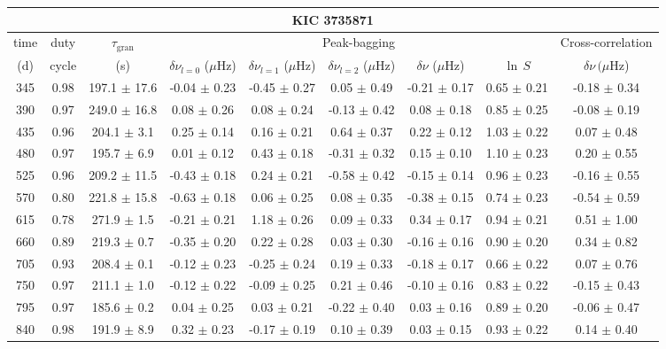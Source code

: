 \documentclass[twocolumn]{aastex61}%
\begin{document}
\begin{table*}[ht]\centering\fontsize{9.}{7.}\selectfont
\begin{tabular}{ccc|ccccc|c}
\multicolumn{9}{c}{KIC 3735871}\\ \hline\hline
time & duty & $\tau_\text{gran}$ &\multicolumn{5}{c|}{Peak-bagging}&Cross-correlation\\
(d)& cycle & (s)&$\delta\nu_{l=0}$ ($\mu$Hz) & $\delta\nu_{l=1}$ ($\mu$Hz) & $\delta\nu_{l=2}$ ($\mu$Hz) & $\delta\nu$ ($\mu$Hz)& $\ln\,S$ & $\delta\nu\,(\mu$Hz)\\\hline
345 & 0.98 & 197.1 $\pm$ 17.6 & -0.04 $\pm$ 0.23 & -0.45 $\pm$ 0.27 & 0.05 $\pm$ 0.49 & -0.21 $\pm$ 0.17 & 0.65 $\pm$ 0.21 & -0.18 $\pm$ 0.34\\
390 & 0.97 & 249.0 $\pm$ 16.8 & 0.08 $\pm$ 0.26 & 0.08 $\pm$ 0.24 & -0.13 $\pm$ 0.42 & 0.08 $\pm$ 0.18 & 0.85 $\pm$ 0.25 & -0.08 $\pm$ 0.19\\
435 & 0.96 & 204.1 $\pm$ 3.1 & 0.25 $\pm$ 0.14 & 0.16 $\pm$ 0.21 & 0.64 $\pm$ 0.37 & 0.22 $\pm$ 0.12 & 1.03 $\pm$ 0.22 & 0.07 $\pm$ 0.48\\
480 & 0.97 & 195.7 $\pm$ 6.9 & 0.01 $\pm$ 0.12 & 0.43 $\pm$ 0.18 & -0.31 $\pm$ 0.32 & 0.15 $\pm$ 0.10 & 1.10 $\pm$ 0.23 & 0.20 $\pm$ 0.55\\
525 & 0.96 & 209.2 $\pm$ 11.5 & -0.43 $\pm$ 0.18 & 0.24 $\pm$ 0.21 & -0.58 $\pm$ 0.42 & -0.15 $\pm$ 0.14 & 0.96 $\pm$ 0.23 & -0.16 $\pm$ 0.55\\
570 & 0.80 & 221.8 $\pm$ 15.8 & -0.63 $\pm$ 0.18 & 0.06 $\pm$ 0.25 & 0.08 $\pm$ 0.35 & -0.38 $\pm$ 0.15 & 0.74 $\pm$ 0.23 & -0.54 $\pm$ 0.59\\
615 & 0.78 & 271.9 $\pm$ 1.5 & -0.21 $\pm$ 0.21 & 1.18 $\pm$ 0.26 & 0.09 $\pm$ 0.33 & 0.34 $\pm$ 0.17 & 0.94 $\pm$ 0.21 & 0.51 $\pm$ 1.00\\
660 & 0.89 & 219.3 $\pm$ 0.7 & -0.35 $\pm$ 0.20 & 0.22 $\pm$ 0.28 & 0.03 $\pm$ 0.30 & -0.16 $\pm$ 0.16 & 0.90 $\pm$ 0.20 & 0.34 $\pm$ 0.82\\
705 & 0.93 & 208.4 $\pm$ 0.1 & -0.12 $\pm$ 0.23 & -0.25 $\pm$ 0.24 & 0.19 $\pm$ 0.33 & -0.18 $\pm$ 0.17 & 0.66 $\pm$ 0.22 & 0.07 $\pm$ 0.76\\
750 & 0.97 & 211.1 $\pm$ 1.0 & -0.12 $\pm$ 0.22 & -0.09 $\pm$ 0.25 & 0.21 $\pm$ 0.46 & -0.10 $\pm$ 0.16 & 0.83 $\pm$ 0.22 & -0.15 $\pm$ 0.43\\
795 & 0.97 & 185.6 $\pm$ 0.2 & 0.04 $\pm$ 0.25 & 0.03 $\pm$ 0.21 & -0.22 $\pm$ 0.40 & 0.03 $\pm$ 0.16 & 0.89 $\pm$ 0.20 & -0.06 $\pm$ 0.47\\
840 & 0.98 & 191.9 $\pm$ 8.9 & 0.32 $\pm$ 0.23 & -0.17 $\pm$ 0.19 & 0.10 $\pm$ 0.39 & 0.03 $\pm$ 0.15 & 0.93 $\pm$ 0.22 & 0.14 $\pm$ 0.40\\

\end{tabular}
\end{table*}
\end{document}
